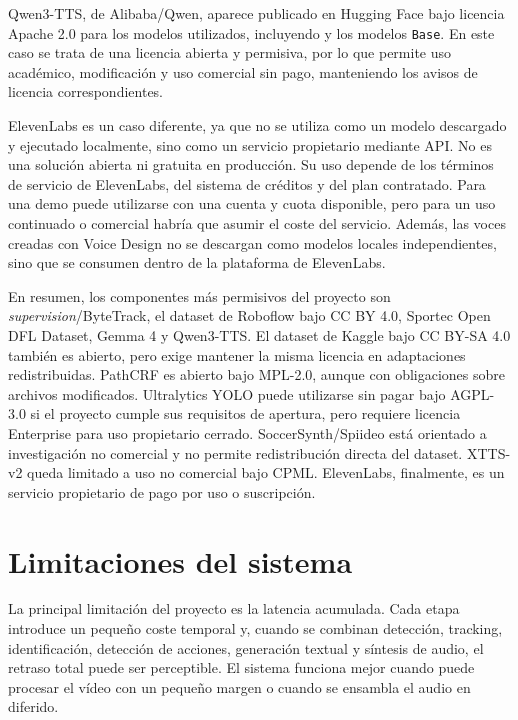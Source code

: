 Qwen3-TTS, de Alibaba/Qwen, aparece publicado en Hugging Face bajo licencia Apache 2.0 para los modelos utilizados, incluyendo  y los modelos \texttt{Base}. En este caso se trata de una licencia abierta y permisiva, por lo que permite uso académico, modificación y uso comercial sin pago, manteniendo los avisos de licencia correspondientes.

ElevenLabs es un caso diferente, ya que no se utiliza como un modelo descargado y ejecutado localmente, sino como un servicio propietario mediante API. No es una solución abierta ni gratuita en producción. Su uso depende de los términos de servicio de ElevenLabs, del sistema de créditos y del plan contratado. Para una demo puede utilizarse con una cuenta y cuota disponible, pero para un uso continuado o comercial habría que asumir el coste del servicio. Además, las voces creadas con Voice Design no se descargan como modelos locales independientes, sino que se consumen dentro de la plataforma de ElevenLabs.

En resumen, los componentes más permisivos del proyecto son \textit{supervision}/ByteTrack, el dataset de Roboflow bajo CC BY 4.0, Sportec Open DFL Dataset, Gemma 4 y Qwen3-TTS. El dataset de Kaggle bajo CC BY-SA 4.0 también es abierto, pero exige mantener la misma licencia en adaptaciones redistribuidas. PathCRF es abierto bajo MPL-2.0, aunque con obligaciones sobre archivos modificados. Ultralytics YOLO puede utilizarse sin pagar bajo AGPL-3.0 si el proyecto cumple sus requisitos de apertura, pero requiere licencia Enterprise para uso propietario cerrado. SoccerSynth/Spiideo está orientado a investigación no comercial y no permite redistribución directa del dataset. XTTS-v2 queda limitado a uso no comercial bajo CPML. ElevenLabs, finalmente, es un servicio propietario de pago por uso o suscripción.

\section{Limitaciones del sistema}

La principal limitación del proyecto es la latencia acumulada. Cada etapa introduce un pequeño coste temporal y, cuando se combinan detección, tracking, identificación, detección de acciones, generación textual y síntesis de audio, el retraso total puede ser perceptible. El sistema funciona mejor cuando puede procesar el vídeo con un pequeño margen o cuando se ensambla el audio en diferido.

